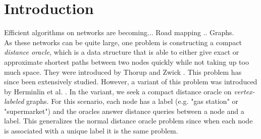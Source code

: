 \section{Introduction}
\label{sec:introduction}
Efficient algorithms on networks are becoming... Road mapping .. Graphs. \\
As these networks can be quite large, one problem is constructing a compact \textit{distance
oracle}, which is a data structure that is able to either give exact or approximate
shortest paths between two nodes quickly while not taking up too much space. They were
introduced by Thorup and Zwick \cite{thorup2005approximate}. This problem has since been
extensively studied. However, a variant of this problem
was introduced by Herminlin et al. \cite{hermelin2011distance}. In the variant, we seek a
compact distance oracle on \textit{vertex-labeled} graphs. For this scenario, each node has a label (e.g. "gas
station" or "supermarket") and the oracles answer distance queries between a node and a
label. This generalizes the normal distance oracle problem since when each node is
associated with a unique label it is the same problem. \\
